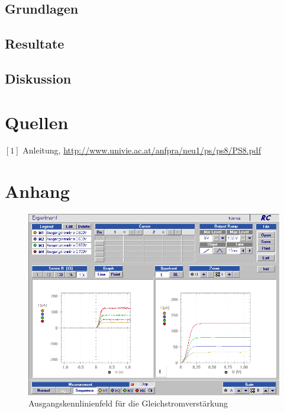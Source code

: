 \documentclass[12pt,a4paper]{article}
\begin{document}
\begin{multicols}{2}


\subsection{Grundlagen}



\subsection{Resultate}


\subsection{Diskussion}


\section{Quellen}
$[1]$ Anleitung, \url{http://www.univie.ac.at/anfpra/neu1/ps/ps8/PS8.pdf}\\

\end{multicols}
\section{Anhang}

\begin{figure}[H]
	\centering
	\includegraphics[scale=0.45]{./data/Braun_Kurz_PS8/Ausgangskennlinienfeld.png}
	\caption{Ausgangskennlinienfeld für die Gleichstromverstärkung}
	\label{fig:ausgangskennlinienfeld}
\end{figure}
\end{document}
